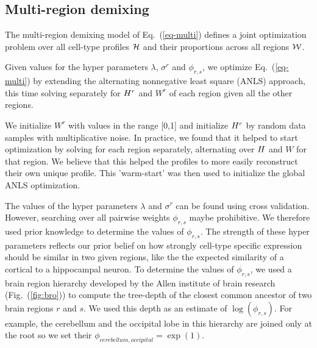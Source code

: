 \documentclass{article} %
\newcommand{\W}{W}
\renewcommand{\eqref}[1]{Eq.~(\ref{#1})}
\newcommand{\figref}[1]{Fig.~(\ref{#1})}
\begin{document}
\subsection{Multi-region demixing}
The multi-region demixing model of \eqref{eq-multi} defines a joint optimization problem over all cell-type profiles $\cal{{H}}$ and their proportions across all regions $\cal{\W}$.

Given values for the hyper parameters $\lambda$, $\sigma^r$ and $\phi_{r,s}$, 
we optimize \eqref{eq-multi} by extending the alternating nonnegative least square (ANLS) approach, this time solving separately for ${{H}^r}$ and ${\W^r}$ of each region given all the other regions. %

We initialize $\W^r$ with values in the range [0,1] and initialize ${H}^r$ by random data samples with multiplicative noise. In practice, we found that it helped to start optimization by solving for each region separately, alternating over ${H}$ and $\W$ for that region. We believe that this helped the profiles to more easily reconstruct their own unique profile. This 'warm-start' was then used to initialize the global ANLS optimization. 

The values of the hyper parameters $\lambda$ and $\sigma^r$ can be found using cross validation. However, searching over all pairwise weights $\phi_{r,s}$ maybe prohibitive. We therefore used prior knowledge to determine the values of $\phi_{r,s}$. The strength of these hyper parameters reflects our prior belief on how strongly cell-type specific expression should be similar in two given regions, like the the expected similarity of a cortical to a hippocampal neuron.
To determine the values of $\phi_{r,s}$, we used a brain region hierarchy developed by the Allen institute of brain research (\figref{fig:bro}) to compute the tree-depth of the closest common ancestor of two brain regions $r$ and $s$. We used this depth as an estimate of $\log(\phi_{r,s})$. For example, the cerebellum and the occipital lobe  in this hierarchy are joined only at the root so we set their $\phi_{cerebellum, occipital} = \exp(1)$. 
\end{document}
